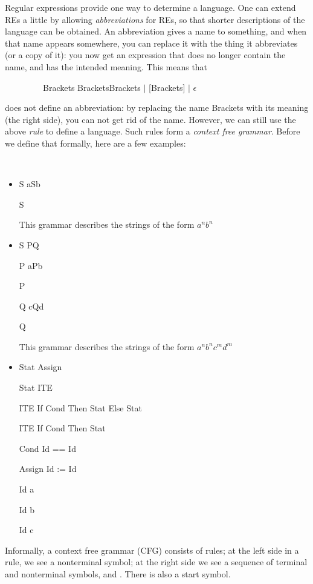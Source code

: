 Regular expressions provide one way to determine a language. One can
extend REs a little by allowing {\em abbreviations} for REs, so that
shorter descriptions of the language can be obtained. An abbreviation
gives a name to something, and when that name appears somewhere, you
can replace it with the thing it abbreviates (or a copy of it):
you now get an expression that does no longer contain the name, and
has the intended meaning. This means that

~~~~~~~~~Brackets \rpijl BracketsBrackets $|$ [Brackets] $|$ $\epsilon$

does not define an abbreviation: by replacing the name Brackets with
its meaning (the right side), you can not get rid of the
name. However, we can still use the above {\em rule} to define a
language. Such rules form a {\em context free grammar}. Before we
define that formally, here are a few examples:

\begin{example}
~~~
\begin{itemize}
\item
S \rpijl aSb

S \rpijl \eps

This grammar describes the strings of the form $a^nb^n$

\item

S \rpijl PQ

P \rpijl aPb

P \rpijl \eps

Q \rpijl cQd

Q \rpijl \eps

This grammar describes the strings of the form $a^nb^nc^md^m$


\item \label{statlabel}
Stat \rpijl Assign

Stat \rpijl ITE

ITE \rpijl If Cond Then Stat Else Stat

ITE \rpijl If Cond Then Stat

Cond \rpijl Id == Id

Assign \rpijl Id := Id

Id \rpijl a

Id \rpijl b

Id \rpijl c

\end{itemize}
\end{example}

Informally, a context free grammar (CFG) consists of rules; at the
left side in a rule, we see a nonterminal symbol; at the right side
we see a sequence of terminal and nonterminal symbols, and
\eps. There is also a start symbol.

